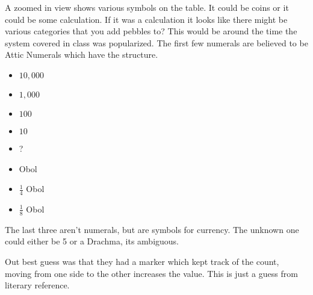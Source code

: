 \documentclass{report}
\begin{document}
\begin{description}
\begin{mdframed}
            A zoomed in view shows various symbols on the table.
            It could be coins or it could be some calculation. If
            it was a calculation it looks like there might be
            various categories that you add pebbles to? This would
            be around the time the system covered in class was
            popularized. The first few numerals are believed to
            be Attic Numerals which have the structure.

            \begin{itemize}
                \item $10,000$
                \item $1,000$ 
                \item $100$
                \item $10$
                \item ?
                \item Obol
                \item $\frac{1}{4}$ Obol
                \item $\frac{1}{8}$ Obol
            \end{itemize}

            The last three aren't numerals, but are symbols for
            currency. The unknown one could either be 5 or
            a Drachma, its ambiguous.
       \end{mdframed}
        \begin{mdframed}
            Out best guess was that they had a marker which
            kept track of the count, moving from one side to the
            other increases the value. This is just a guess
            from literary reference.


\end{mdframed}
\end{description}
\end{document}
